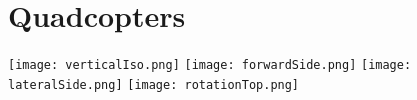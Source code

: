 \chapter{Quadcopters}


\texttt{[image: verticalIso.png]}
\texttt{[image: forwardSide.png]}
\texttt{[image: lateralSide.png]}
\texttt{[image: rotationTop.png]}


